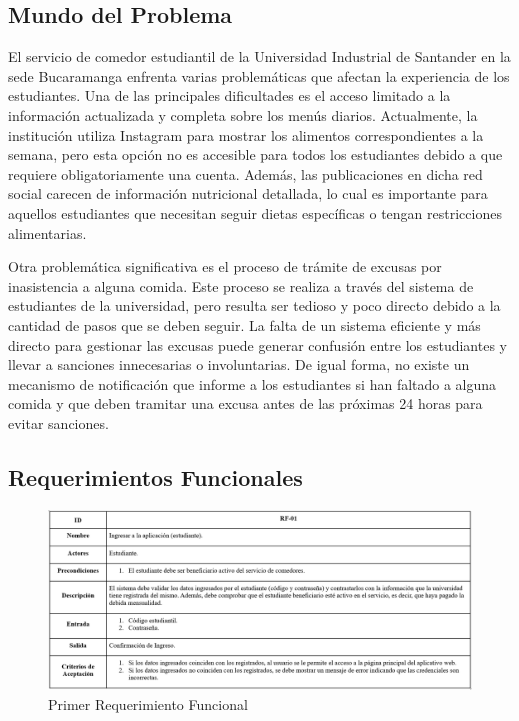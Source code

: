 \documentclass[stu, 12pt, letterpaper, donotrepeattitle, floatsintext, natbib]{apa7}
\begin{document}
\subsection{Mundo del Problema}
El servicio de comedor estudiantil de la Universidad Industrial de Santander en la sede Bucaramanga enfrenta varias problemáticas que afectan la experiencia de los estudiantes. Una de las principales dificultades es el acceso limitado a la información actualizada y completa sobre los menús diarios. Actualmente, la institución utiliza Instagram para mostrar los alimentos correspondientes a la semana, pero esta opción no es accesible para todos los estudiantes debido a que requiere obligatoriamente una cuenta. Además, las publicaciones en dicha red social carecen de información nutricional detallada, lo cual es importante para aquellos estudiantes que necesitan seguir dietas específicas o tengan restricciones alimentarias.

Otra problemática significativa es el proceso de trámite de excusas por inasistencia a alguna comida. Este proceso se realiza a través del sistema de estudiantes de la universidad, pero resulta ser tedioso y poco directo debido a la cantidad de pasos que se deben seguir. La falta de un sistema eficiente y más directo para gestionar las excusas puede generar confusión entre los estudiantes y llevar a sanciones innecesarias o involuntarias. De igual forma, no existe un mecanismo de notificación que informe a los estudiantes si han faltado a alguna comida y que deben tramitar una excusa antes de las próximas 24 horas para evitar sanciones.

\newpage
\subsection{Requerimientos Funcionales}

\begin{figure}[H]
	\caption[]{Primer Requerimiento Funcional}
	\label{Primer Requerimiento Funcional}
	\includegraphics[width=1\linewidth]{Requerimientos Funcionales/1. Requerimiento Funcional.png}
\end{figure}
\end{document}
